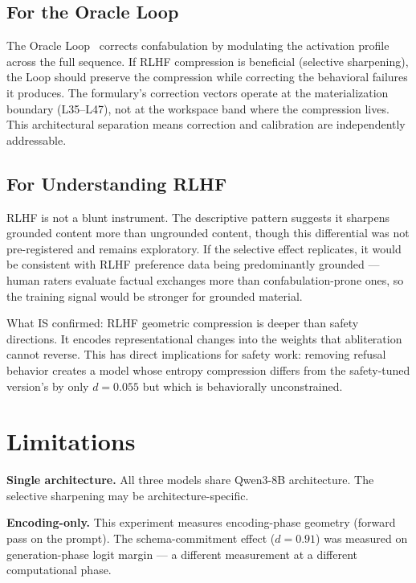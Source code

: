 \documentclass[11pt,a4paper]{article}
\begin{document}
\subsection{For the Oracle Loop}

The Oracle Loop~\citep{lyra2026oracle} corrects confabulation by
modulating the activation profile across the full sequence. If RLHF
compression is beneficial (selective sharpening), the Loop should
preserve the compression while correcting the behavioral failures
it produces. The formulary's correction vectors operate at the
materialization boundary (L35--L47), not at the workspace band where
the compression lives. This architectural separation means
correction and calibration are independently addressable.

\subsection{For Understanding RLHF}

RLHF is not a blunt instrument. The descriptive pattern suggests
it sharpens grounded content more than ungrounded content, though
this differential was not pre-registered and remains exploratory.
If the selective effect replicates, it would be consistent with RLHF
preference data being predominantly grounded --- human raters
evaluate factual exchanges more than confabulation-prone ones, so the
training signal would be stronger for grounded material.

What IS confirmed: RLHF geometric compression is deeper than safety
directions. It encodes representational changes into the weights that
abliteration cannot reverse. This has direct implications for safety
work: removing refusal behavior creates a model whose entropy
compression differs from the safety-tuned version's by only
$d{=}0.055$ but which is behaviorally unconstrained.

\section{Limitations}
\label{sec:limitations}

\textbf{Single architecture.} All three models share Qwen3-8B
architecture. The selective sharpening may be architecture-specific.

\textbf{Encoding-only.} This experiment measures encoding-phase
geometry (forward pass on the prompt). The schema-commitment effect
($d{=}0.91$) was measured on generation-phase logit margin
--- a different measurement at a different computational phase.
\end{document}
